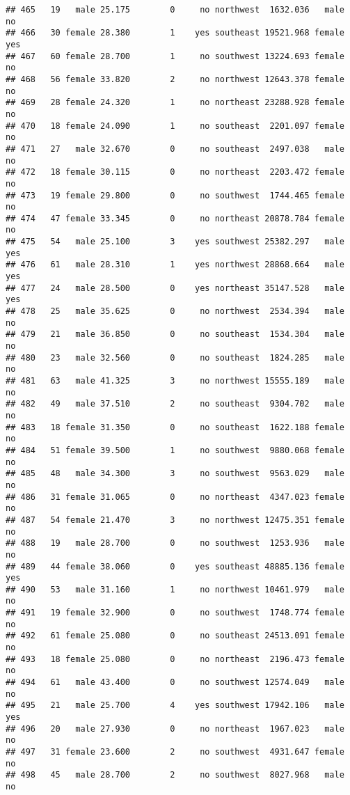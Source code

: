 \documentclass[
]{article}
\begin{document}
\begin{verbatim}
## 465   19   male 25.175        0     no northwest  1632.036   male       no
## 466   30 female 28.380        1    yes southeast 19521.968 female      yes
## 467   60 female 28.700        1     no southwest 13224.693 female       no
## 468   56 female 33.820        2     no northwest 12643.378 female       no
## 469   28 female 24.320        1     no northeast 23288.928 female       no
## 470   18 female 24.090        1     no southeast  2201.097 female       no
## 471   27   male 32.670        0     no southeast  2497.038   male       no
## 472   18 female 30.115        0     no northeast  2203.472 female       no
## 473   19 female 29.800        0     no southwest  1744.465 female       no
## 474   47 female 33.345        0     no northeast 20878.784 female       no
## 475   54   male 25.100        3    yes southwest 25382.297   male      yes
## 476   61   male 28.310        1    yes northwest 28868.664   male      yes
## 477   24   male 28.500        0    yes northeast 35147.528   male      yes
## 478   25   male 35.625        0     no northwest  2534.394   male       no
## 479   21   male 36.850        0     no southeast  1534.304   male       no
## 480   23   male 32.560        0     no southeast  1824.285   male       no
## 481   63   male 41.325        3     no northwest 15555.189   male       no
## 482   49   male 37.510        2     no southeast  9304.702   male       no
## 483   18 female 31.350        0     no southeast  1622.188 female       no
## 484   51 female 39.500        1     no southwest  9880.068 female       no
## 485   48   male 34.300        3     no southwest  9563.029   male       no
## 486   31 female 31.065        0     no northeast  4347.023 female       no
## 487   54 female 21.470        3     no northwest 12475.351 female       no
## 488   19   male 28.700        0     no southwest  1253.936   male       no
## 489   44 female 38.060        0    yes southeast 48885.136 female      yes
## 490   53   male 31.160        1     no northwest 10461.979   male       no
## 491   19 female 32.900        0     no southwest  1748.774 female       no
## 492   61 female 25.080        0     no southeast 24513.091 female       no
## 493   18 female 25.080        0     no northeast  2196.473 female       no
## 494   61   male 43.400        0     no southwest 12574.049   male       no
## 495   21   male 25.700        4    yes southwest 17942.106   male      yes
## 496   20   male 27.930        0     no northeast  1967.023   male       no
## 497   31 female 23.600        2     no southwest  4931.647 female       no
## 498   45   male 28.700        2     no southwest  8027.968   male       no

\end{verbatim}
\end{document}
